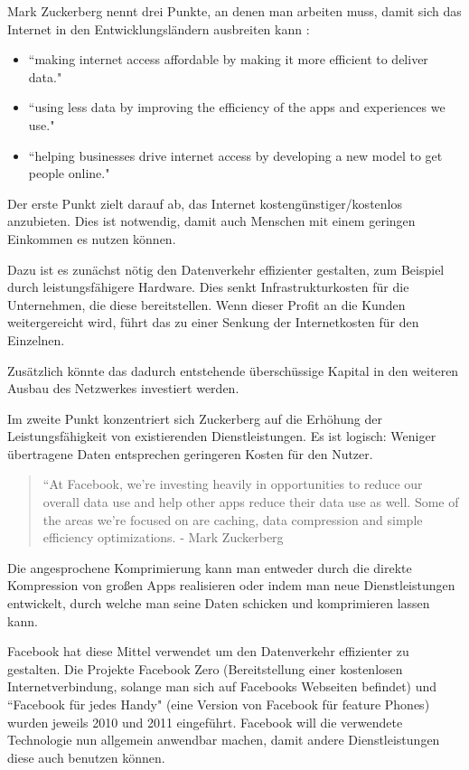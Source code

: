 \documentclass{article}
\begin{document}
Mark Zuckerberg nennt drei Punkte, an denen man arbeiten muss, damit sich das Internet in den Entwicklungsländern ausbreiten kann
\parencite{HumanRight}:

\begin{itemize}
\item ``making internet access affordable by making it more efficient to deliver data."
\item ``using less data by improving the efficiency of the apps and experiences we use."
\item ``helping businesses drive internet access by developing a new model to get people online."  
\end{itemize}

Der erste Punkt zielt darauf ab, das Internet kostengünstiger/kostenlos anzubieten. 
Dies ist notwendig, damit auch Menschen mit einem geringen Einkommen es nutzen können.

Dazu ist es zunächst nötig den Datenverkehr effizienter gestalten, zum Beispiel durch leistungsfähigere Hardware.
Dies senkt Infrastrukturkosten für die Unternehmen, die diese bereitstellen.
Wenn dieser Profit an die Kunden weitergereicht wird, führt das zu einer Senkung der Internetkosten für den Einzelnen.

Zusätzlich könnte das dadurch entstehende überschüssige Kapital in den weiteren Ausbau des Netzwerkes investiert werden.

\medskip

Im zweite Punkt konzentriert sich Zuckerberg auf die Erhöhung der Leistungsfähigkeit von existierenden Dienstleistungen.
Es ist logisch: Weniger übertragene Daten entsprechen geringeren Kosten für den Nutzer.

\begin{quote}
``At Facebook, we’re investing heavily in opportunities to reduce our overall data use and help  other apps     
reduce their data use as well. Some of the areas we’re focused on are caching, data compression and simple efficiency optimizations.
- Mark Zuckerberg \textcite[8]{HumanRight}
\end{quote}

Die angesprochene Komprimierung kann man entweder durch die direkte Kompression von großen Apps realisieren oder indem man neue Dienstleistungen entwickelt, durch welche man seine Daten schicken und komprimieren lassen kann.

Facebook hat diese Mittel verwendet um den Datenverkehr effizienter zu gestalten.
Die Projekte Facebook Zero (Bereitstellung einer kostenlosen Internetverbindung, solange man sich auf Facebooks Webseiten befindet) und ``Facebook für jedes Handy" (eine Version von Facebook für feature Phones) wurden jeweils  2010 und 2011 eingeführt.
Facebook will die verwendete Technologie nun allgemein anwendbar machen, damit andere Dienstleistungen diese auch benutzen können.
\end{document}
